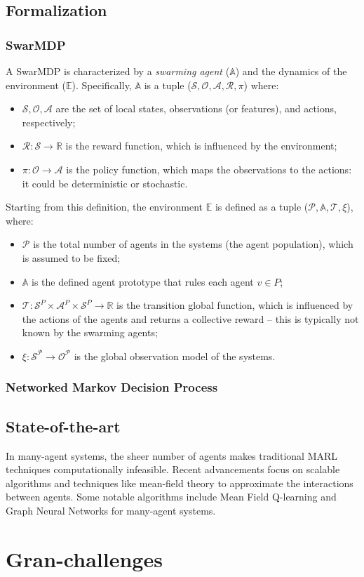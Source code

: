 \subsection{Formalization}
\subsubsection{SwarMDP}
A SwarMDP is characterized by a \emph{swarming agent} ($\mathbb{A}$) and the dynamics of the environment ($\mathbb{E}$).
Specifically, $\mathbb{A}$ is a tuple ($\mathcal{S}, \mathcal{O}, \mathcal{A}, \mathcal{R}, \pi$) where:
\begin{itemize}
  \item $\mathcal{S, O, A}$ are the set of local states, observations (or features), and actions, respectively;
  \item $\mathcal{R}: \mathcal{S} \rightarrow \mathbb{R}$ is the reward function, which is influenced by the environment;
  \item $\pi: \mathcal{O} \rightarrow \mathcal{A}$ is the policy function, which maps the observations to the actions: it could be deterministic or stochastic.
\end{itemize}
Starting from this definition, the environment $\mathbb{E}$ is defined as a tuple ($\mathcal{P}, \mathbb{A}, \mathcal{T}, \xi$), where:
\begin{itemize}
  \item $\mathcal{P}$ is the total number of agents in the systems (the agent population), which is assumed to be fixed;
  \item $\mathbb{A}$ is the defined agent prototype that rules each agent $v \in P$;
  \item $\mathcal{T}: \mathcal{S}^P \times \mathcal{A}^P \times \mathcal{S}^P \rightarrow \mathbb{R}$ is the transition  global function, which is influenced by the actions of the agents and returns a collective reward -- this is typically not known by the swarming agents;
  \item $\xi: \mathcal{S^P} \rightarrow \mathcal{O^P}$ is the global observation model of the systems.
\end{itemize}
\subsubsection{Networked Markov Decision Process}

\subsection{State-of-the-art}
In many-agent systems, the sheer number of agents makes traditional MARL techniques computationally infeasible. Recent advancements focus on scalable algorithms and techniques like mean-field theory to approximate the interactions between agents. Some notable algorithms include Mean Field Q-learning and Graph Neural Networks for many-agent systems.

\section{Gran-challenges}
